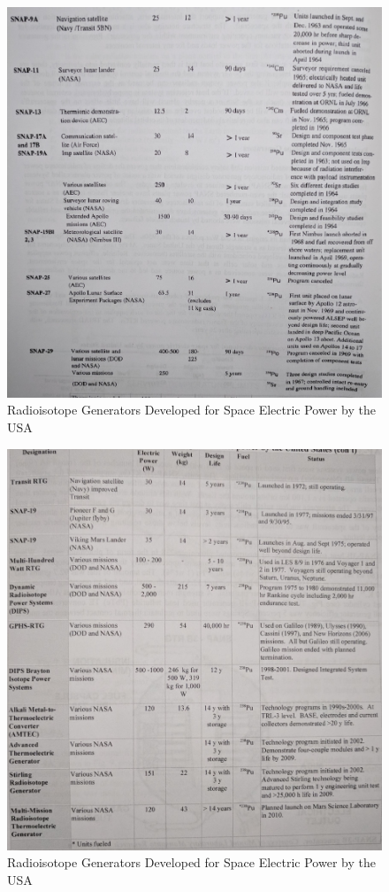 \documentclass{article}
\begin{document}
\begin{figure}[]
	\centering
	\includegraphics[height=0.55\textheight]{fig/table2}
	\caption[Radioisotope Generators Developed for Space Electric Power by the USA]{Radioisotope Generators Developed for Space Electric Power by the USA~\cite{buden2011spacebook1}}
	\label{table2}
\end{figure}

\begin{figure}[]
	\centering
	\includegraphics[height=0.55\textheight]{fig/table3}
	\caption[Radioisotope Generators Developed for Space Electric Power by the USA]{Radioisotope Generators Developed for Space Electric Power by the USA~\cite{buden2011spacebook1}}
	\label{table3}
\end{figure}
\end{document}
